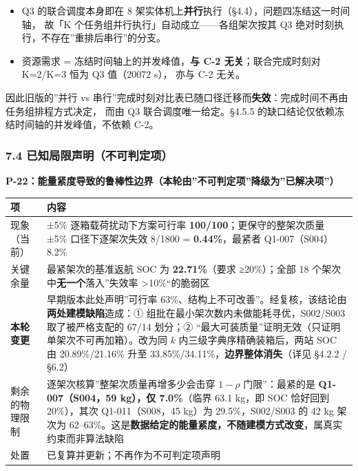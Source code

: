 \documentclass[
  10.5pt,
]{extarticle}
\newcounter{none} %
\providecommand{\tightlist}{%
  \setlength{\itemsep}{0pt}\setlength{\parskip}{0pt}}
\begin{document}
\begin{itemize}
\tightlist
\item
  Q3 的联合调度本身即在 8
  架实体机上\textbf{并行}执行（§4.4），问题四冻结这一时间轴， 故「K
  个任务组并行执行」自动成立------各组架次按其 Q3
  绝对时刻执行，不存在''重排后串行''的分支。
\item
  资源需求 = 冻结时间轴上的并发峰值，\textbf{与 C-2
  无关}；联合完成时刻对 K=2/K=3 恒为 Q3 值（20072 s）， 亦与 C-2 无关。
\end{itemize}

因此旧版的''并行 vs
串行''完成时刻对比表已随口径迁移而\textbf{失效}：完成时间不再由任务组排程方式决定，
而由 Q3 联合调度唯一给定。§4.5.5
的缺口结论仅依赖冻结时间轴的并发峰值，不依赖 C-2。

\subsubsection{7.4
已知局限声明（不可判定项）}\label{ux5df2ux77e5ux5c40ux9650ux58f0ux660eux4e0dux53efux5224ux5b9aux9879}

\textbf{P-22：能量紧度导致的鲁棒性边界（本轮由''不可判定项''降级为''已解决项''）}

{\def\LTcaptype{none} %
\begin{longtable}[]{@{}
  >{\raggedright\arraybackslash}p{}
  >{\raggedright\arraybackslash}p{}@{}}
\toprule\noalign{}
\begin{minipage}[b]{\linewidth}\raggedright
项
\end{minipage} & \begin{minipage}[b]{\linewidth}\raggedright
内容
\end{minipage} \\
\midrule\noalign{}
\endhead
\bottomrule\noalign{}
\endlastfoot
现象（当前） & ±5\% 逐箱载荷扰动下方案可行率
\textbf{100/100}；更保守的整架次质量 ±5\% 口径下逐架次失效 8/1800 =
\textbf{0.44\%}，最紧者 Q1-007（S004）8.2\% \\
关键余量 & 最紧架次的基准返航 SOC 为 \textbf{22.71\%}（要求
≥20\%）；全部 18 个架次中\textbf{无一个}落入''失效率
\textgreater10\%``的脆弱区 \\
\textbf{本轮变更} & 早期版本此处声明''可行率
63\%、结构上不可改善''。经复核，该结论由\textbf{两处建模缺陷}造成：①
组批在最小架次数内未做能耗寻优，S002/S003 取了被严格支配的 67/14 划分；②
``最大可装质量''证明无效（只证明单架次不可再加箱）。改为同 \(k\)
内三级字典序精确装箱后，两站 SOC 由 20.89\%/21.16\% 升至
33.85\%/34.11\%，\textbf{边界整体消失}（详见 §4.2.2 / §6.2） \\
剩余的物理限制 & 逐架次核算''整架次质量再增多少会击穿 \(1-\rho\)
门限''：最紧的是 \textbf{Q1-007（S004，59 kg），仅 7.0\%}（临界 63.1
kg，即 SOC 恰好回到 20\%），其次 Q1-011（S008，45 kg）为
29.5\%，S002/S003 的 42 kg 架次为
62--63\%。这是\textbf{数据给定的能量紧度，不随建模方式改变}，属真实约束而非算法缺陷 \\
处置 & 已复算并更新；不再作为不可判定项声明 \\
\end{longtable}
}
\end{document}

